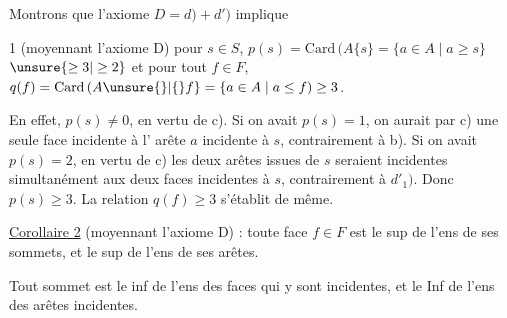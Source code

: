 Montrons que l'axiome $D=d)+d')$ implique

 1 (moyennant l'axiome D) pour  $s\in S$,
 $p(s)=\mathrm{Card}\,(A\{s\}=\{a\in A\mid a\geq s\}$  $\unsure{\geq3|\geq2}$ et pour
tout $f\in F$, $q(f)=\mathrm{Card}\,(A\unsure{\}|\{}f\}=\{a\in A\mid a\leq f)\geq3$.

En effet,  $p(s)\ne0$, en vertu de
c). Si on avait $p(s)=1$, on aurait par c) une
seule face incidente à l' arête $a$ incidente à $s$,
contrairement à b). Si on avait $p(s)=2$, en vertu
de c) les deux arêtes issues de $s$ seraient incidentes
simultanément aux deux faces incidentes à $s$,
contrairement à $d'_1)$. Donc $p(s)\geq3$. La relation
$q(f)\geq3$ s'établit de même.

\uline{Corollaire 2} (moyennant l'axiome D) : toute face
$f\in F$ est le sup de l'ens de ses sommets,
et le sup de l'ens de ses arêtes.

Tout sommet est le inf de l'ens des
faces qui y sont incidentes, et le
Inf de l'ens des arêtes incidentes.
